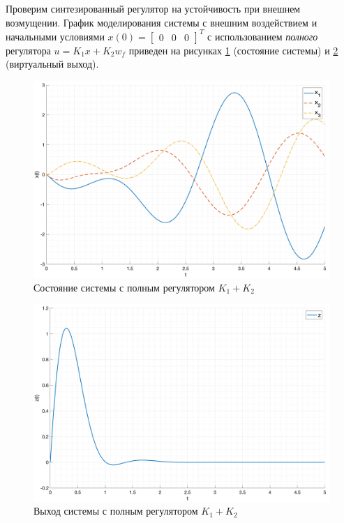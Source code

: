 Проверим синтезированный регулятор на устойчивость при внешнем возмущении. 
График моделирования системы с внешним воздействием и начальными условиями 
$x(0) = \begin{bmatrix}0 & 0 & 0\end{bmatrix}^T$ с использованием \textit{полного}
регулятора $u = K_1x + K_2w_f$ приведен на рисунках \ref{fig:K_full_x} (состояние системы) и \ref{fig:K_full_z} (виртуальный выход).
\begin{figure}[ht!]
    \centering
    \includegraphics[width=\textwidth]{media/plots/full_x.png}
    \caption{Состояние системы с полным регулятором $K_1 + K_2$}
    \label{fig:K_full_x}
\end{figure}
\begin{figure}[ht!]
    \centering
    \includegraphics[width=\textwidth]{media/plots/full_z.png}
    \caption{Выход системы с полным регулятором $K_1 + K_2$}
    \label{fig:K_full_z}
\end{figure}
